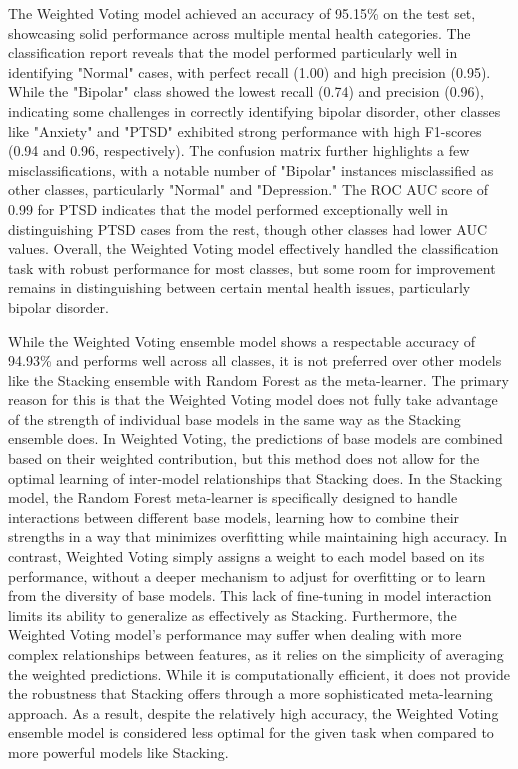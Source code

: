 \noindent
The Weighted Voting model achieved an accuracy of 95.15\% on the test set, showcasing solid performance across multiple mental health categories. The classification report reveals that the model performed particularly well in identifying "Normal" cases, with perfect recall (1.00) and high precision (0.95). While the "Bipolar" class showed the lowest recall (0.74) and precision (0.96), indicating some challenges in correctly identifying bipolar disorder, other classes like "Anxiety" and "PTSD" exhibited strong performance with high F1-scores (0.94 and 0.96, respectively). The confusion matrix further highlights a few misclassifications, with a notable number of "Bipolar" instances misclassified as other classes, particularly "Normal" and "Depression." The ROC AUC score of 0.99 for PTSD indicates that the model performed exceptionally well in distinguishing PTSD cases from the rest, though other classes had lower AUC values. Overall, the Weighted Voting model effectively handled the classification task with robust performance for most classes, but some room for improvement remains in distinguishing between certain mental health issues, particularly bipolar disorder.

\noindent
While the Weighted Voting ensemble model shows a respectable accuracy of 94.93\% and performs well across all classes, it is not preferred over other models like the Stacking ensemble with Random Forest as the meta-learner. The primary reason for this is that the Weighted Voting model does not fully take advantage of the strength of individual base models in the same way as the Stacking ensemble does. In Weighted Voting, the predictions of base models are combined based on their weighted contribution, but this method does not allow for the optimal learning of inter-model relationships that Stacking does. In the Stacking model, the Random Forest meta-learner is specifically designed to handle interactions between different base models, learning how to combine their strengths in a way that minimizes overfitting while maintaining high accuracy. In contrast, Weighted Voting simply assigns a weight to each model based on its performance, without a deeper mechanism to adjust for overfitting or to learn from the diversity of base models. This lack of fine-tuning in model interaction limits its ability to generalize as effectively as Stacking. Furthermore, the Weighted Voting model's performance may suffer when dealing with more complex relationships between features, as it relies on the simplicity of averaging the weighted predictions. While it is computationally efficient, it does not provide the robustness that Stacking offers through a more sophisticated meta-learning approach. As a result, despite the relatively high accuracy, the Weighted Voting ensemble model is considered less optimal for the given task when compared to more powerful models like Stacking.


